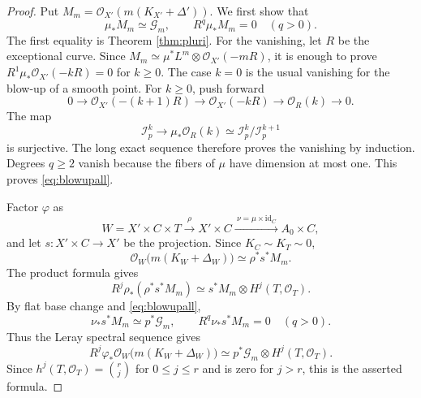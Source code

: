 \documentclass[10pt,a4paper]{amsart}
\newcommand{\OO}{\mathcal O}
\newcommand{\GG}{\mathcal G}
\newcommand{\II}{\mathcal I}
\begin{document}
\begin{proof}
Put $M_m=\OO_{X'}(m(K_{X'}+\Delta'))$. We first show that
\begin{equation}\label{eq:blowupall}
\mu_*M_m\simeq\GG_m,\qquad R^q\mu_*M_m=0\quad(q>0).
\end{equation}
The first equality is Theorem \ref{thm:pluri}. For the vanishing, let $R$ be the exceptional curve. Since $M_m\simeq\mu^*L^m\otimes\OO_{X'}(-mR)$, it is enough to prove $R^1\mu_*\OO_{X'}(-kR)=0$ for $k\ge0$. The case $k=0$ is the usual vanishing for the blow-up of a smooth point. For $k\ge0$, push forward
\[
0\longrightarrow\OO_{X'}(-(k+1)R)\longrightarrow\OO_{X'}(-kR)
\longrightarrow\OO_R(k)\longrightarrow0.
\]
The map
\[
\II_p^k\longrightarrow\mu_*\OO_R(k)
\simeq\II_p^k/\II_p^{k+1}
\]
is surjective. The long exact sequence therefore proves the vanishing by induction. Degrees $q\ge2$ vanish because the fibers of $\mu$ have dimension at most one. This proves \eqref{eq:blowupall}.

Factor $\varphi$ as
\[
W=X'\times C\times T\xrightarrow{\ \rho\ }X'\times C
\xrightarrow{\ \nu=\mu\times\mathrm{id}_C\ }A_0\times C,
\]
and let $s:X'\times C\to X'$ be the projection. Since $K_C\sim K_T\sim0$,
\[
\OO_W\bigl(m(K_W+\Delta_W)\bigr)\simeq\rho^*s^*M_m.
\]
The product formula gives
\[
R^j\rho_*(\rho^*s^*M_m)\simeq s^*M_m\otimes H^j(T,\OO_T).
\]
By flat base change and \eqref{eq:blowupall},
\[
\nu_*s^*M_m\simeq p^*\GG_m,\qquad R^q\nu_*s^*M_m=0\quad(q>0).
\]
Thus the Leray spectral sequence gives
\[
R^j\varphi_*\OO_W\bigl(m(K_W+\Delta_W)\bigr)
\simeq p^*\GG_m\otimes H^j(T,\OO_T).
\]
Since $h^j(T,\OO_T)=\binom rj$ for $0\le j\le r$ and is zero for $j>r$, this is the asserted formula.


\end{proof}
\end{document}
